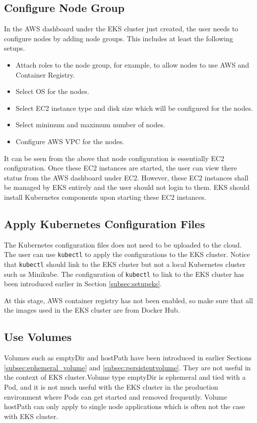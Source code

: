 \subsection{Configure Node Group}

In the AWS dashboard under the EKS cluster just created, the user needs to configure nodes by adding node groups. This includes at least the following setups.
\begin{itemize}
  \item Attach roles to the node group, for example, to allow nodes to use AWS  and Container Registry.
  \item Select OS for the nodes.
  \item Select EC2 instance type and disk size which will be configured for the nodes.
  \item Select minimum and maximum number of nodes.
  \item Configure AWS VPC for the nodes.
\end{itemize}

It can be seen from the above that node configuration is essentially EC2 configuration. Once these EC2 instances are started, the user can view there status from the AWS dashboard under EC2. However, these EC2 instances shall be managed by EKS entirely and the user should not login to them. EKS should install Kubernetes components upon starting these EC2 instances.

\subsection{Apply Kubernetes Configuration Files}

The Kubernetes configuration files does not need to be uploaded to the cloud. The user can use \verb|kubectl| to apply the configurations to the EKS cluster. Notice that \verb|kubectl| should link to the EKS cluster but not a local Kubernetes cluster such as Minikube. The configuration of \verb|kubectl| to link to the EKS cluster has been introduced earlier in Section \ref{subsec:setupeks}.

At this stage, AWS container registry has not been enabled, so make sure that all the images used in the EKS cluster are from Docker Hub.

\subsection{Use Volumes}

Volumes such as emptyDir and hostPath have been introduced in earlier Sections \ref{subsec:ephemeral_volume} and \ref{subsec:persistentvolume}. They are not useful in the context of EKS cluster.Volume type emptyDir is ephemeral and tied with a Pod, and it is not much useful with the EKS cluster in the production environment where Pods can get started and removed frequently. Volume hostPath can only apply to single node applications which is often not the case with EKS cluster.

